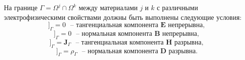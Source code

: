 \documentclass[a4paper,12pt]{article}
\newcommand{\Jmp}[1]{[\![ { #1 } ]\!]}
\begin{document}
На границе $\Gamma = \Omega^j \cap \Omega^k$ между материалами $j$ и $k$ с различными электрофизическими свойствами должны быть выполнены следующие условия:
\begin{equation}
	\Jmp{ \mathbf{E} \times \mathbf{n} }_{\Gamma} = 0 \text{~~--~тангенциальная компонента $\mathbf{E}$ непрерывна}, \label{eq:maxwell:tangent_E}
\end{equation}
\begin{equation*}
	\Jmp{ \mathbf{B} \cdot \mathbf{n} }_{\Gamma} = 0 \text{~~--~нормальная компонента $\mathbf{B}$ непрерывна}, \label{eq:maxwell:normal_B}
\end{equation*}
\begin{equation*}
	\Jmp{ \mathbf{H} \times \mathbf{n} }_{\Gamma} = \mathbf{J}_{\Gamma} \text{~~--~тангенциальная компонента $\mathbf{H}$ разрывна}, \label{eq:maxwell:tangent_H}
\end{equation*}
\begin{equation}
	\Jmp{ \mathbf{D} \cdot \mathbf{n} }_{\Gamma} = \rho_{\Gamma} \text{~~--~нормальная компонента $\mathbf{D}$ разрывна}. \label{eq:maxwell:normal_D}
\end{equation}
\end{document}
